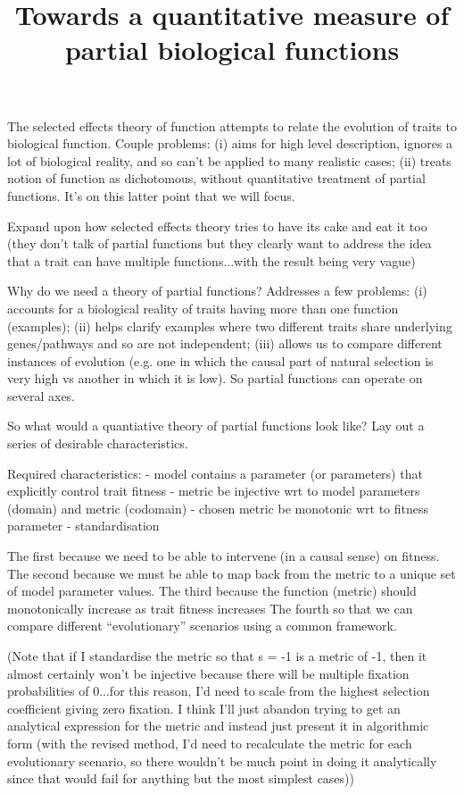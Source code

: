\documentclass{article}
\title{Towards a quantitative measure of partial biological functions}
\begin{document}
\maketitle


The selected effects theory of function attempts to relate the evolution of traits to biological function. Couple problems: (i) aims for high level description, ignores a lot of biological reality, and so can't be applied to many realistic cases; (ii) treats notion of function as dichotomous, without quantitative treatment of partial functions. It's on this latter point that we will focus.

Expand upon how selected effects theory tries to have its cake and eat it too (they don't talk of partial functions but they clearly want to address the idea that a trait can have multiple functions...with the result being very vague)

Why do we need a theory of partial functions? Addresses a few problems: (i) accounts for a biological reality of traits having more than one function (examples); (ii) helps clarify examples where two different traits share underlying genes/pathways and so are not independent; (iii) allows us to compare different instances of evolution (e.g. one in which the causal part of natural selection is very high vs another in which it is low). So partial functions can operate on several axes.

So what would a quantiative theory of partial functions look like? Lay out a series of desirable characteristics.

Required characteristics:
- model contains a parameter (or parameters) that explicitly control trait fitness
- metric be injective wrt to model parameters (domain) and metric (codomain)
- chosen metric be monotonic wrt to fitness parameter
- standardisation

The first because we need to be able to intervene (in a causal sense) on fitness.
The second because we must be able to map back from the metric to a unique set of model parameter values.
The third because the function (metric) should monotonically increase as trait fitness increases
The fourth so that we can compare different ``evolutionary'' scenarios using a common framework.

(Note that if I standardise the metric so that s = -1 is a metric of -1, then it almost certainly won't be injective because there will be multiple fixation probabilities of 0...for this reason, I'd need to scale from the highest selection coefficient giving zero fixation. I think I'll just abandon trying to get an analytical expression for the metric and instead just present it in algorithmic form (with the revised method, I'd need to recalculate the metric for each evolutionary scenario, so there wouldn't be much point in doing it analytically since that would fail for anything but the most simplest cases))
\end{document}
